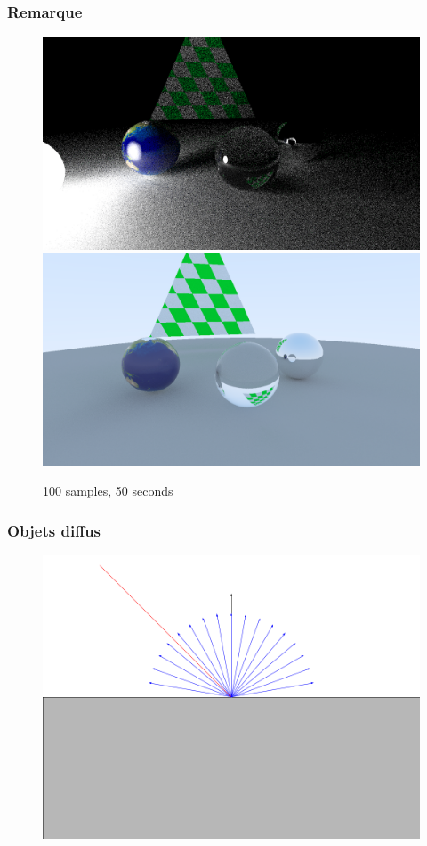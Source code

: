 \documentclass[handout]{beamer}
\begin{document}
\begin{frame}

    \frametitle{Remarque}
    \begin{figure}
        \includegraphics[scale=0.13]{night.png}
        \includegraphics[scale=0.13]{day.png}
        \caption{100 samples, 50 seconds}
    \end{figure}

\end{frame}

\begin{frame}
    \frametitle{Objets diffus}
    \begin{figure}
        \includegraphics[scale=0.3]{Lambertian.png}
    \end{figure}
\end{frame}
\end{document}
